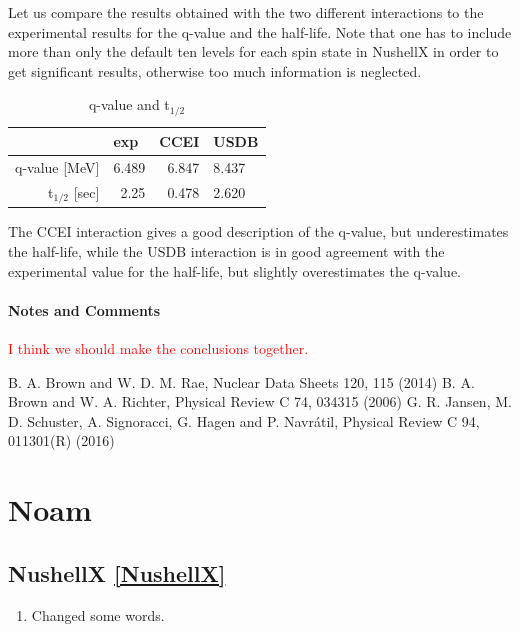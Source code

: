 \documentclass[12pt,a4paper]{article}
\begin{document}
Let us compare the results obtained with the two different interactions to the experimental results for the q-value and the half-life. Note that one has to include more than only the default ten levels for each spin state in NushellX in order to get significant results, otherwise too much information is neglected.
\begin{table}[h!]
\caption{q-value and t$_{1/2}$}
\begin{center}
\begin{tabular}{r@{\qquad}r@{\qquad}r@{\qquad}r@{\qquad}l}
\hline
\multicolumn{1}{l}{\rule{0pt}{12pt}
                   }&\multicolumn{1}{l}{exp}&\multicolumn{1}{l}{CCEI}&\multicolumn{2}{l}{USDB}\\[2pt]
\hline\rule{0pt}{12pt}
q-value [MeV]   &     6.489 & 6.847 & 8.437 &\\
t$_{1/2}$ [sec] &     2.25  & 0.478 & 2.620 &\\[2pt]
\hline
\end{tabular}
\end{center}
\end{table}

The CCEI interaction gives a good description of the q-value, but underestimates the half-life, while the USDB interaction is in good agreement with the experimental value for the half-life, but slightly overestimates the q-value.

%
\paragraph{Notes and Comments}
\textcolor{red}{I think we should make the conclusions together.}

%
%
\begin{thebibliography}{3}
%
B. A. Brown and W. D. M. Rae, Nuclear Data Sheets 120, 115 (2014)
B. A. Brown and W. A. Richter, Physical Review C 74, 034315 (2006)
G. R. Jansen, M. D. Schuster, A. Signoracci, G. Hagen and P. Navr\'atil, Physical Review C 94, 011301(R) (2016)

\end{thebibliography}

\appendix
\section{Noam}

\subsection{NushellX \ref{NushellX}} 
\begin{enumerate}
	\item Changed some words.
\end{enumerate}
\end{document}
